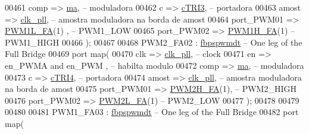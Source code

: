 \begin{DoxyCode}
00461          comp  => \hyperlink{class_d_e0___n_a_n_o___v_f_1_1_m_a_i_n_a02405666f0ec5525888d897c8ddb079f}{ma},\textcolor{keyword}{ -- moduladora     }
00462          c => \hyperlink{class_d_e0___n_a_n_o___v_f_1_1_m_a_i_n_a5629e2e1f290ee8718490a7f096055fe}{cTRI3},\textcolor{keyword}{ -- portadora}
00463          amost => \hyperlink{class_d_e0___n_a_n_o___v_f_1_1_m_a_i_n_a1d63ebfc050c1099e1dff991817ec3b0}{clk\_pll},\textcolor{keyword}{ -- amostra moduladora na borda de amost}
00464          port\_PWM01  => \hyperlink{class_d_e0___n_a_n_o___v_f_a292e884f4d72fca8a1bec36c11933ef7}{PWM1L\_FA}\textcolor{vhdlchar}{(}\textcolor{vhdllogic}{1}\textcolor{vhdlchar}{)} ,\textcolor{keyword}{ -- PWM1\_LOW}
00465          port\_PWM02 => \hyperlink{class_d_e0___n_a_n_o___v_f_af21e77adde949f9a9a599f25976a6a74}{PWM1H\_FA}\textcolor{vhdlchar}{(}\textcolor{vhdllogic}{1}\textcolor{vhdlchar}{)}\textcolor{keyword}{   --PWM1\_HIGH}
00466          \textcolor{vhdlchar}{)};  
00467         
00468 PWM2\_FA02 : \hyperlink{classfbpspwmdt}{fbpspwmdt} -- One leg \textcolor{keywordflow}{of} the Full Bridge
00469     \textcolor{keywordflow}{port} \textcolor{keywordflow}{map}( 
00470          clk => \hyperlink{class_d_e0___n_a_n_o___v_f_1_1_m_a_i_n_a1d63ebfc050c1099e1dff991817ec3b0}{clk\_pll},\textcolor{keyword}{ -- clock}
00471          en => en\_PWMA \textcolor{keywordflow}{and} en\_PWM  ,\textcolor{keyword}{ -- habilta modulo}
00472          comp  => \hyperlink{class_d_e0___n_a_n_o___v_f_1_1_m_a_i_n_a02405666f0ec5525888d897c8ddb079f}{ma},\textcolor{keyword}{ -- moduladora     }
00473          c => \hyperlink{class_d_e0___n_a_n_o___v_f_1_1_m_a_i_n_a569a3e9bfb8853bdf2c985d444cb4863}{cTRI4},\textcolor{keyword}{ -- portadora}
00474          amost => \hyperlink{class_d_e0___n_a_n_o___v_f_1_1_m_a_i_n_a1d63ebfc050c1099e1dff991817ec3b0}{clk\_pll},\textcolor{keyword}{ -- amostra moduladora na borda de amost}
00475          port\_PWM01  => \hyperlink{class_d_e0___n_a_n_o___v_f_a3a05a366015b8398929044188870fa7b}{PWM2H\_FA}\textcolor{vhdlchar}{(}\textcolor{vhdllogic}{1}\textcolor{vhdlchar}{)},\textcolor{keyword}{ -- PWM2\_HIGH}
00476          port\_PWM02 => \hyperlink{class_d_e0___n_a_n_o___v_f_a357d73a496027c4f7000298ecdc41a05}{PWM2L\_FA}\textcolor{vhdlchar}{(}\textcolor{vhdllogic}{1}\textcolor{vhdlchar}{)}\textcolor{keyword}{   -- PWM2\_LOW}
00477          \textcolor{vhdlchar}{)};                  
00478          
00479          
00480 
00481 PWM1\_FA03 : \hyperlink{classfbpspwmdt}{fbpspwmdt} -- One leg \textcolor{keywordflow}{of} the Full Bridge
00482     \textcolor{keywordflow}{port} \textcolor{keywordflow}{map}( 

\end{DoxyCode}
